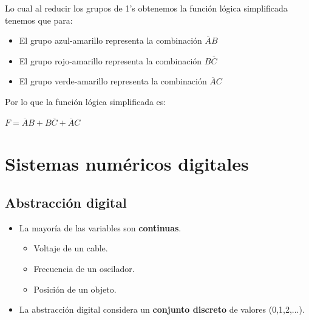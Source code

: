 \documentclass{templateNote}
\begin{document}
\begin{tcolorbox}[colback=blue!10!white,colframe=blue!75!black,title=Ejemplo]
\begin{center}
\end{center}
Lo cual al reducir los grupos de 1's obtenemos la función lógica simplificada tenemos que para:
\begin{itemize}
    \item El grupo azul-amarillo representa la combinación $\overline{A}B$
    \item El grupo rojo-amarillo representa la combinación $B\overline{C}$
    \item El grupo verde-amarillo representa la combinación $\overline{A}C$
\end{itemize} 
Por lo que la función lógica simplificada es:
\begin{center}
    \textbf{$F = \overline{A}B + B\overline{C} + \overline{A}C$}       
\end{center}
\end{tcolorbox}
\newpage

\section{Sistemas numéricos digitales}
\subsection{Abstracción digital}
\begin{itemize}
    \item La mayoría de las variables son \textbf{continuas}.
    \begin{itemize}
        \item Voltaje de un cable.
        \item Frecuencia de un oscilador.
        \item Posición de un objeto.
    \end{itemize}
    \item La abstracción digital considera un \textbf{conjunto discreto} de valores (0,1,2,...).
\end{itemize}
\end{document}
